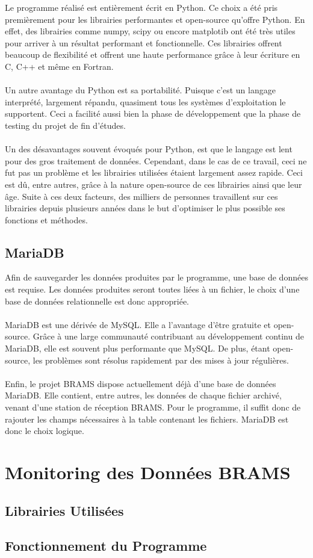 \documentclass[11pt]{article}
\begin{document}
Le programme réalisé est entièrement écrit en Python.
Ce choix a été pris premièrement pour les librairies performantes et open-source qu'offre Python.
En effet, des librairies comme numpy, scipy ou encore matplotib ont été très utiles pour arriver à un résultat performant et fonctionnelle.
Ces librairies offrent beaucoup de flexibilité et offrent une haute performance grâce à leur écriture en C, C++ et même en Fortran.\\
\\
Un autre avantage du Python est sa portabilité.
Puisque c'est un langage interprété, largement répandu, quasiment tous les systèmes d'exploitation le supportent.
Ceci a facilité aussi bien la phase de développement que la phase de testing du projet de fin d'études.\\
\\
Un des désavantages souvent évoqués pour Python, est que le langage est lent pour des gros traitement de données.
Cependant, dans le cas de ce travail, ceci ne fut pas un problème et les librairies utilisées étaient largement assez rapide.
Ceci est dû, entre autres, grâce à la nature open-source de ces librairies ainsi que leur âge.
Suite à ces deux facteurs, des milliers de personnes travaillent sur ces librairies depuis plusieurs années dans le but d'optimiser le plus possible ses fonctions et méthodes.

\subsection{MariaDB}

Afin de sauvegarder les données produites par le programme, une base de données est requise.
Les données produites seront toutes liées à un fichier, le choix d'une base de données relationnelle est donc appropriée.\\
\\
MariaDB est une dérivée de MySQL.
Elle a l'avantage d'être gratuite et open-source.
Grâce à une large communauté contribuant au développement continu de MariaDB, elle est souvent plus performante que MySQL.
De plus, étant open-source, les problèmes sont résolus rapidement par des mises à jour régulières.\\
\\
Enfin, le projet BRAMS dispose actuellement déjà d'une base de données MariaDB.
Elle contient, entre autres, les données de chaque fichier archivé, venant d'une station de réception BRAMS.
Pour le programme, il suffit donc de rajouter les champs nécessaires à la table contenant les fichiers.
MariaDB est donc le choix logique.

\newpage

\section{Monitoring des Données BRAMS}

\subsection{Librairies Utilisées}

\subsection{Fonctionnement du Programme}
\end{document}
